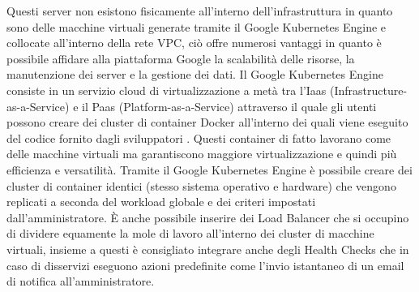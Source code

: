 Questi server non esistono fisicamente all'interno dell'infrastruttura in quanto sono delle macchine virtuali generate tramite il Google Kubernetes Engine e collocate all'interno della rete VPC, ciò offre numerosi vantaggi in quanto è possibile affidare alla piattaforma Google la scalabilità delle risorse, la manutenzione dei server e la gestione dei dati. Il Google Kubernetes Engine consiste in un servizio cloud di virtualizzazione a metà tra l'Iaas (Infrastructure-as-a-Service) e il Paas (Platform-as-a-Service) attraverso il quale gli utenti possono creare dei cluster di container Docker all'interno dei quali viene eseguito del codice fornito dagli sviluppatori \cite{Kubernetes}. Questi container di fatto lavorano come delle macchine virtuali ma garantiscono maggiore virtualizzazione e quindi più efficienza e versatilità. Tramite il Google Kubernetes Engine è possibile creare dei cluster di container identici (stesso sistema operativo e hardware) che vengono replicati a seconda del workload globale e dei criteri impostati dall'amministratore. È anche possibile inserire dei Load Balancer che si occupino di dividere equamente la mole di lavoro all'interno dei cluster di macchine virtuali, insieme a questi è consigliato integrare anche degli Health Checks che in caso di disservizi eseguono azioni predefinite come l'invio istantaneo di un email di notifica all'amministratore. 
